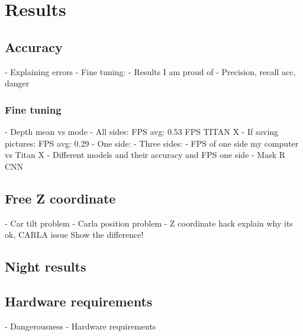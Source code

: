 \chapter{Results}
\label{chap:results}

\section{Accuracy}
- Explaining errors
- Fine tuning:
- Results I am proud of
- Precision, recall acc, danger

\subsection{Fine tuning}
- Depth mean vs mode
- All sides: FPS avg:  0.53 FPS TITAN X
  - If saving pictures: FPS avg:  0.29
- One side:
- Three sides:
- FPS of one side my computer vs Titan X
- Different models and their accuracy and FPS one side
- Mask R CNN
\section{Free Z coordinate}
- Car tilt problem
- Carla position problem
- Z coordinate hack explain why its ok, CARLA issue
    Show the difference!

\section{Night results}

\section{Hardware requirements}
- Dangerousness
- Hardware requirements